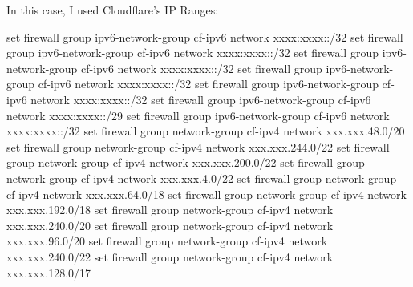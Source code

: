 \documentclass[
]{article}
\newenvironment{Shaded}{\begin{snugshade}}{\end{snugshade}}
\newcommand{\BuiltInTok}[1]{#1}
\newcommand{\NormalTok}[1]{#1}
\newcommand{\StringTok}[1]{\textcolor[rgb]{0.31,0.60,0.02}{#1}}
\begin{document}
In this case, I used Cloudflare's IP Ranges:

\begin{Shaded}
\begin{Highlighting}[numbers=left,,]
\BuiltInTok{set}\NormalTok{ firewall group ipv6{-}network{-}group cf{-}ipv6 network }\StringTok{\textquotesingle{}xxxx:xxxx::/32\textquotesingle{}}
\BuiltInTok{set}\NormalTok{ firewall group ipv6{-}network{-}group cf{-}ipv6 network }\StringTok{\textquotesingle{}xxxx:xxxx::/32\textquotesingle{}}
\BuiltInTok{set}\NormalTok{ firewall group ipv6{-}network{-}group cf{-}ipv6 network }\StringTok{\textquotesingle{}xxxx:xxxx::/32\textquotesingle{}}
\BuiltInTok{set}\NormalTok{ firewall group ipv6{-}network{-}group cf{-}ipv6 network }\StringTok{\textquotesingle{}xxxx:xxxx::/32\textquotesingle{}}
\BuiltInTok{set}\NormalTok{ firewall group ipv6{-}network{-}group cf{-}ipv6 network }\StringTok{\textquotesingle{}xxxx:xxxx::/32\textquotesingle{}}
\BuiltInTok{set}\NormalTok{ firewall group ipv6{-}network{-}group cf{-}ipv6 network }\StringTok{\textquotesingle{}xxxx:xxxx::/29\textquotesingle{}}
\BuiltInTok{set}\NormalTok{ firewall group ipv6{-}network{-}group cf{-}ipv6 network }\StringTok{\textquotesingle{}xxxx:xxxx::/32\textquotesingle{}}
\BuiltInTok{set}\NormalTok{ firewall group network{-}group cf{-}ipv4 network }\StringTok{\textquotesingle{}xxx.xxx.48.0/20\textquotesingle{}}
\BuiltInTok{set}\NormalTok{ firewall group network{-}group cf{-}ipv4 network }\StringTok{\textquotesingle{}xxx.xxx.244.0/22\textquotesingle{}}
\BuiltInTok{set}\NormalTok{ firewall group network{-}group cf{-}ipv4 network }\StringTok{\textquotesingle{}xxx.xxx.200.0/22\textquotesingle{}}
\BuiltInTok{set}\NormalTok{ firewall group network{-}group cf{-}ipv4 network }\StringTok{\textquotesingle{}xxx.xxx.4.0/22\textquotesingle{}}
\BuiltInTok{set}\NormalTok{ firewall group network{-}group cf{-}ipv4 network }\StringTok{\textquotesingle{}xxx.xxx.64.0/18\textquotesingle{}}
\BuiltInTok{set}\NormalTok{ firewall group network{-}group cf{-}ipv4 network }\StringTok{\textquotesingle{}xxx.xxx.192.0/18\textquotesingle{}}
\BuiltInTok{set}\NormalTok{ firewall group network{-}group cf{-}ipv4 network }\StringTok{\textquotesingle{}xxx.xxx.240.0/20\textquotesingle{}}
\BuiltInTok{set}\NormalTok{ firewall group network{-}group cf{-}ipv4 network }\StringTok{\textquotesingle{}xxx.xxx.96.0/20\textquotesingle{}}
\BuiltInTok{set}\NormalTok{ firewall group network{-}group cf{-}ipv4 network }\StringTok{\textquotesingle{}xxx.xxx.240.0/22\textquotesingle{}}
\BuiltInTok{set}\NormalTok{ firewall group network{-}group cf{-}ipv4 network }\StringTok{\textquotesingle{}xxx.xxx.128.0/17\textquotesingle{}}

\end{Highlighting}
\end{Shaded}
\end{document}

